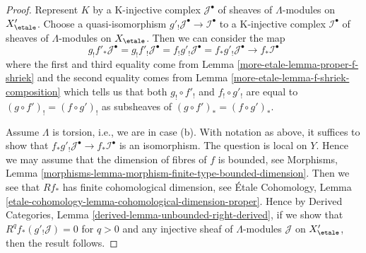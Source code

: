 \begin{proof}
Represent $K$ by a K-injective complex $\mathcal{J}^\bullet$ of
sheaves of $\Lambda$-modules on $X'_\etale$. Choose a quasi-isomorphism
$g'_!\mathcal{J}^\bullet \to \mathcal{I}^\bullet$ to a
K-injective complex $\mathcal{I}^\bullet$ of
sheaves of $\Lambda$-modules on $X_\etale$.
Then we can consider the map
$$
g_!f'_*\mathcal{J}^\bullet =
g_!f'_!\mathcal{J}^\bullet =
f_!g'_!\mathcal{J}^\bullet =
f_*g'_!\mathcal{J}^\bullet \to
f_*\mathcal{I}^\bullet
$$
where the first and third equality come from
Lemma \ref{more-etale-lemma-proper-f-shriek}
and the second equality comes from
Lemma \ref{more-etale-lemma-f-shriek-composition} which tells us that both
$g_! \circ f'_!$ and $f_! \circ g'_!$ are equal to
$(g \circ f')_! = (f \circ g')_!$ as subsheaves of
$(g \circ f')_* = (f \circ g')_*$.

\medskip\noindent
Assume $\Lambda$ is torsion, i.e., we are in case (b).
With notation as above, it suffices to show that
$f_*g'_!\mathcal{J}^\bullet \to f_*\mathcal{I}^\bullet$
is an isomorphism. The question is local on $Y$.
Hence we may assume that the dimension
of fibres of $f$ is bounded, see Morphisms, Lemma
\ref{morphisms-lemma-morphism-finite-type-bounded-dimension}.
Then we see that $Rf_*$ has finite cohomological dimension, see
\'Etale Cohomology, Lemma
\ref{etale-cohomology-lemma-cohomological-dimension-proper}.
Hence by Derived Categories, Lemma \ref{derived-lemma-unbounded-right-derived},
if we show that $R^qf_*(g'_!\mathcal{J}) = 0$ for $q > 0$
and any injective sheaf of $\Lambda$-modules $\mathcal{J}$
on $X'_\etale$, then the result follows.


\end{proof}
